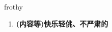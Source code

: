 
\begin{frame}
{\huge frothy}
\begin{center}
\begin{enumerate}\Large
  \item \textbf{(内容等)快乐轻佻、不严肃的}
\end{enumerate}
\end{center}
\end{frame}

